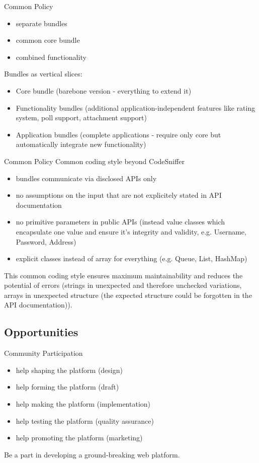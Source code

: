 \documentclass{beamer}
\begin{document}
	\begin{frame}{Common Policy}
		\begin{itemize}
			\item separate bundles
			\item common core bundle
			\item combined functionality
		\end{itemize}
		
		Bundles as vertical slices:
		\begin{itemize}
			\item Core bundle (barebone version - everything to extend it)
			\item Functionality bundles (additional application-independent features like rating system, poll support, attachment support)
			\item Application bundles (complete applications - require only core but automatically integrate new functionality)
		\end{itemize}
	\end{frame}
	
	\begin{frame}{Common Policy}
		Common coding style beyond CodeSniffer
		\begin{itemize}
			\item bundles communicate via disclosed APIs only
			\item no assumptions on the input that are not explicitely stated in API documentation
			\item no primitive parameters in public APIs (instead value classes which encapsulate one value and ensure
			it's integrity and validity, e.g. Username, Password, Address)
			\item explicit classes instead of array for everything (e.g. Queue, List, HashMap)
		\end{itemize}
		This common coding style ensures maximum maintainability and reduces the potential of errors (strings in
		unexpected and therefore unchecked variations, arrays in unexpected structure (the expected structure could be
		forgotten in the API documentation)).
	\end{frame}
	
	\subsection{Opportunities}
	
	\begin{frame}{Community}
		Participation
		\begin{itemize}
			\item help shaping the platform (design)
			\item help forming the platform (draft)
			\item help making the platform (implementation)
			\item help testing the platform (quality assurance)
			\item help promoting the platform (marketing)
		\end{itemize}
		
		Be a part in developing a ground-breaking web platform.
	\end{frame}
	
\end{document}
